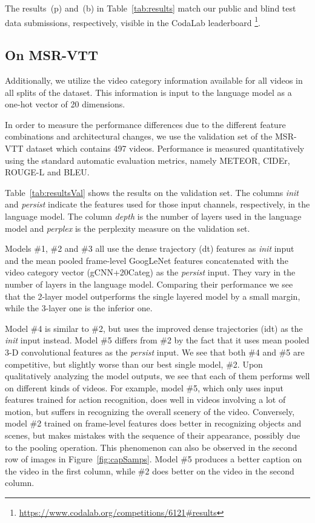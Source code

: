 The results~(p) and~(b) in Table~\ref{tab:results} match our public and blind
test data submissions, respectively, visible in the CodaLab leaderboard%
\footnote{\scriptsize\url{https://www.codalab.org/competitions/6121\#results}}.

\subsection{On MSR-VTT}
Additionally, we utilize the video category information available for all videos
in all splits of the dataset.
This information is input to the language model as a one-hot vector of 20
dimensions.

In order to measure the performance differences due to the different feature
combinations and architectural changes, we use the validation set of the MSR-VTT
dataset which contains 497 videos.
Performance is measured quantitatively using the standard automatic evaluation
metrics, namely METEOR, CIDEr, ROUGE-L and BLEU. 

Table~\ref{tab:resultsVal} shows the results on the validation set.
The columns \emph{init} and \emph{persist} indicate the features used for those
input channels, respectively, in the language model.
The column \emph{depth} is the number of layers used in the language model and
\emph{perplex} is the perplexity measure on the validation set.

Models \#1, \#2 and \#3 all use the dense trajectory (dt) features as
\emph{init} input and the mean pooled frame-level GoogLeNet features
concatenated with the video category vector (gCNN+20Categ) as the \emph{persist}
input.
They vary in the number of layers in the language model.
Comparing their performance we see that the 2-layer model outperforms the single
layered model by a small margin, while the 3-layer one is the inferior one.

Model \#4 is similar to \#2, but uses the improved dense trajectories (idt) as
the \emph{init} input instead.
Model \#5 differs from \#2 by the fact that it uses mean pooled 3-D
convolutional features as the \emph{persist} input.
We see that both \#4 and \#5 are competitive, but slightly worse than our best
single model, \#2.
Upon qualitatively analyzing the model outputs, we see that each of them
performs well on different kinds of videos.
For example, model \#5, which only uses input features trained for action
recognition, does well in videos involving a lot of motion, but suffers in
recognizing the overall scenery of the video.
Conversely, model \#2 trained on frame-level features does better in recognizing
objects and scenes, but makes mistakes with the sequence of their appearance,
possibly due to the pooling operation.
This phenomenon can also be observed in the second row of images in
Figure~\ref{fig:capSamps}. Model \#5 produces a better caption on the video in
the first column, while \#2 does better on the video in the second column.

